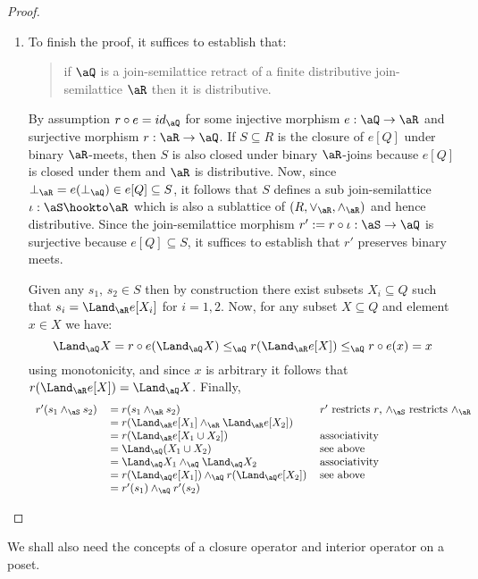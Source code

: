 \documentclass{article}
\begin{document}
\begin{proof}
\begin{enumerate}
\begin{enumerate}
\item
To finish the proof, it suffices to establish that:
\begin{quote}
if $\aQ$ is a join-semilattice retract of a finite distributive join-semilattice $\aR$ then it is distributive.
\end{quote}
By assumption $r \circ e = id_\aQ$ for some injective morphism $e : \aQ \to \aR$ and surjective morphism $r : \aR \to \aQ$. If $S \subseteq R$ is the closure of $e[Q]$ under binary $\aR$-meets, then $S$ is also closed under binary $\aR$-joins because $e[Q]$ is closed under them and $\aR$ is distributive. Now, since $\bot_\aR = e(\bot_\aQ) \in e[Q] \subseteq S$, it follows that $S$ defines a sub join-semilattice $\iota : \aS \hookto \aR$ which is also a sublattice of $(R,\lor_\aR,\land_\aR)$ and hence distributive. Since the join-semilattice morphism $r' := r \circ \iota : \aS \to \aQ$ is surjective because $e[Q] \subseteq S$, it suffices to establish that $r'$ preserves binary meets.

\smallskip
Given any $s_1,\,s_2 \in S$ then by construction there exist subsets $X_i \subseteq Q$ such that $s_i = \Land_\aR e[X_i]$ for $i = 1,2$. Now, for any subset $X \subseteq Q$ and element $x \in X$ we have:
\[
\Land_\aQ X = r \circ e(\Land_\aQ X)
\leq_\aQ r(\Land_\aR e[X])
\leq_\aQ r \circ e(x) = x
\]
using monotonicity, and since $x$ is arbitrary it follows that $r(\Land_\aR e[X]) = \Land_\aQ X$. Finally,
\[
\begin{tabular}{lll}
$r'(s_1 \land_\aS s_2)$
&
$= r(s_1 \land_\aR s_2)$
& $r'$ restricts $r$, $\land_\aS$ restricts $\land_\aR$
\\&
$= r(\Land_\aR e[X_1] \land_\aR \Land_\aR e[X_2])$
& 
\\&
$= r(\Land_\aR e[X_1 \cup X_2])$
& associativity
\\&
$= \Land_\aQ (X_1 \cup X_2)$
& see above
\\&
$= \Land_\aQ X_1 \land_\aQ \Land_\aQ X_2$
& associativity
\\&
$= r(\Land_\aQ e[X_1]) \land_\aQ r(\Land_\aQ e[X_2])$
& see above
\\&
$= r'(s_1) \land_\aQ r'(s_2)$
& 
\end{tabular}
\]


\end{enumerate}
\end{enumerate}
\end{proof}


We shall also need the concepts of a closure operator and interior operator on a poset.
\end{document}
